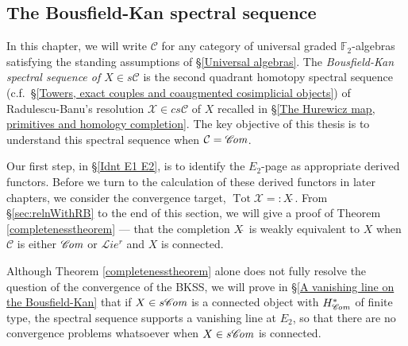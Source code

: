 \documentclass[11pt]{amsart} \renewcommand{\baselinestretch}{1.2}
\theoremstyle{plain}
\numberwithin{equation}{section} %
\theoremstyle{plain}
\numberwithin{equation}{chapter} %
\DeclareMathOperator{\Tot}{Tot}
\newcommand{\scrL}{\mathscr{L}}
\newcommand{\scrC}{\mathscr{C}}
\newcommand{\calC}{\mathcal{C}}
\newcommand{\calx}{\mathcal{X}}
\newcommand{\calc}{\mathcal{C}}
\newcommand{\F}{\mathbb{F}}
\newcommand{\algs}{{\scrC\!\textit{\normalfont\textit{om}}}}
\newcommand{\restliealgs}{{\scrL\!\textit{ie}^\textit{r}}}
\newcommand{\algcat}{{\calc}}%
\newcommand{\Ftwo}{\F_2}
\newcommand{\BKSS}{BKSS}
\newcommand{\SectionOrChapter}[1]{\section{\textbf{#1}}}
\begin{document}
\begin{Bousfield-Kan spectral sequence}
\SectionOrChapter{The Bousfield-Kan spectral sequence}
\label{Bousfield-Kan spectral sequence}

In this chapter, we will write $\algcat$ for any category of universal graded $\Ftwo $-algebras satisfying the standing assumptions of \S\ref{Universal algebras}. The \emph{Bousfield-Kan spectral sequence of $X\in s\algcat$} is the second quadrant homotopy spectral sequence (c.f.\ \S\ref{Towers, exact couples and coaugmented cosimplicial objects}) of Radulescu-Banu's resolution $\calx\in cs\algcat$ of $X$ recalled in \S\ref{The Hurewicz map, primitives and homology completion}.
The key objective of this thesis is to understand this spectral sequence when $\calc=\algs$.

Our first step, in \S\ref{Idnt E1 E2}, is to identify the $E_2$-page as appropriate derived functors. Before we turn to the calculation of these derived functors in later chapters, we consider the convergence target, $\Tot \calx=:X\hat{\ }$. From \S\ref{sec:relnWithRB} to the end of this section, we will give a proof of Theorem \ref{completenesstheorem} --- that the completion $X\hat{\ } $ is weakly equivalent to $X$ when $\calC$ is either $\algs$ or $\restliealgs$ and $X$ is connected.

Although Theorem \ref{completenesstheorem} alone does not fully resolve the question of the convergence  of the \BKSS, we will prove in \S\ref{A vanishing line on the Bousfield-Kan} that if $X\in s\algs$ is a connected object with $H^*_\algs$ of finite type, the spectral sequence supports a vanishing line at $E_2$, so that there are no convergence problems whatsoever when $X\in s\algs$ is connected.





\end{Bousfield-Kan spectral sequence}
\end{document}

